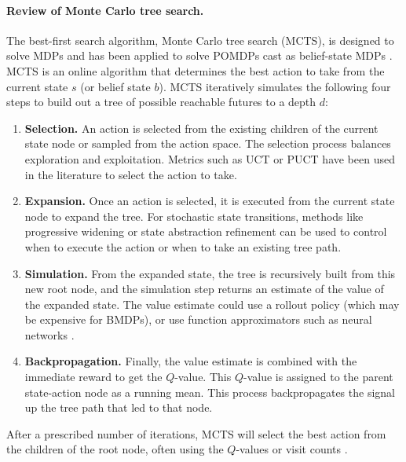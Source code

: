 \paragraph{Review of Monte Carlo tree search.}
The best-first search algorithm, Monte Carlo tree search (MCTS), is designed to solve MDPs \cite{coulom2007efficient} and has been applied to solve POMDPs cast as belief-state MDPs \cite{sunberg2018online,fischer2020information,moss2024betazero}.
MCTS is an online algorithm that determines the best action to take from the current state $s$ (or belief state $b$).
MCTS iteratively simulates the following four steps to build out a tree of possible reachable futures to a depth $d$:
\begin{enumerate}
    \item \textbf{Selection.}\quad 
    An action is selected from the existing children of the current state node or sampled from the action space.
    The selection process balances exploration and exploitation.
    Metrics such as UCT \cite{kocsis2006bandit} or PUCT \cite{silver2017mastering} have been used in the literature to select the action to take. 
    \item \textbf{Expansion.}\quad 
    Once an action is selected, it is executed from the current state node to expand the tree.
    For stochastic state transitions, methods like progressive widening \cite{couetoux2011continuous} or state abstraction refinement \cite{sokota2021monte} can be used to control when to execute the action or when to take an existing tree path.
    \item \textbf{Simulation.}\quad 
    From the expanded state, the tree is recursively built from this new root node, and the
    simulation step returns an estimate of the value of the expanded state.
    The value estimate could use a rollout policy \cite{silver2016mastering} (which may be expensive for BMDPs), or use function approximators such as neural networks \cite{silver2017mastering,fischer2022guiding,moss2024betazero}.
    \item \textbf{Backpropagation.}\quad 
    Finally, the value estimate is combined with the immediate reward to get the $Q$-value.
    This $Q$-value is assigned to the parent state-action node as a running mean.
    This process backpropagates the signal up the tree path that led to that node. 
\end{enumerate}
After a prescribed number of iterations, MCTS will select the best action from the children of the root node, often using the $Q$-values or visit counts \cite{browne2012survey}.


